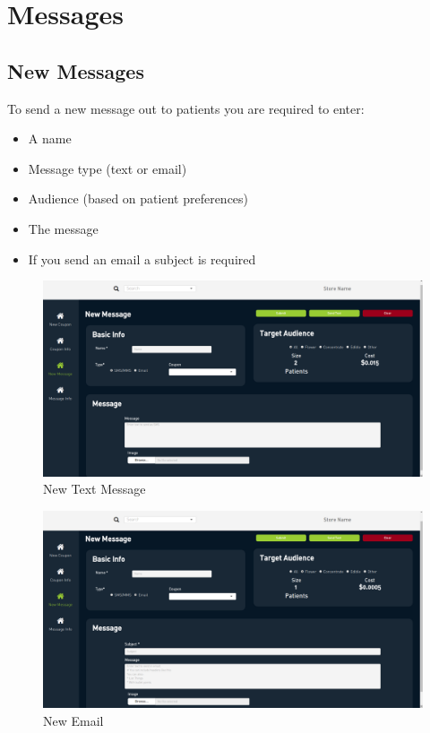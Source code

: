 \documentclass[]{book}
\theoremstyle{definition}
\theoremstyle{definition}
\theoremstyle{definition}
\theoremstyle{remark}
\begin{document}
\section{Messages}\label{messages}

\subsection{New Messages}\label{new-messages}

To send a new message out to patients you are required to enter:

\begin{itemize}
\item
  A name
\item
  Message type (text or email)
\item
  Audience (based on patient preferences)
\item
  The message
\item
  If you send an email a subject is required
\end{itemize}

\begin{figure}
\centering
\includegraphics{images/C5.png}
\caption{New Text Message}
\end{figure}

\begin{figure}
\centering
\includegraphics{images/C6.png}
\caption{New Email}
\end{figure}
\end{document}
